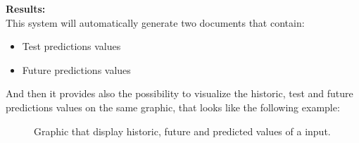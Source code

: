 \textbf{Results:}\\
This system will automatically generate two documents that contain:
\vspace{-5mm}
\begin{itemize}
 \setlength{\itemsep}{-5pt} 
\item Test predictions values
\item Future predictions values
\end{itemize}

And then it provides also the possibility to visualize the historic, test and future predictions values on the same graphic, that looks like the following example:

\begin{figure}[H]
	\centering
    \caption{Graphic that display historic, future and predicted values of a input.}
\end{figure}


\newpage



